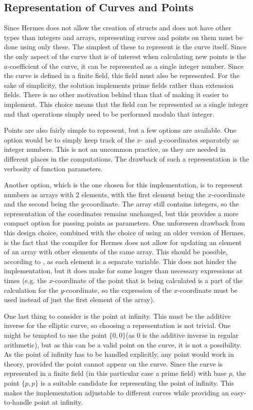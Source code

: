 \subsection{Representation of Curves and Points}
Since Hermes does not allow the creation of structs and does not have other types than integers and arrays, representing curves and points on them must be done using only these. The simplest of these to represent is the curve itself. Since the only aspect of the curve that is of interest when calculating new points is the $a$-coefficient of the curve, it can be represented as a single integer number. Since the curve is defined in a finite field, this field must also be represented. For the sake of simplicity, the solution implements prime fields rather than extension fields. There is no other motivation behind than that of making it easier to implement. This choice means that the field can be represented as a single integer and that operations simply need to be performed modulo that integer.

Points are also fairly simple to represent, but a few options are available. One option would be to simply keep track of the $x$- and $y$-coordinates separately as integer numbers. This is not an uncommon practice, as they are needed in different places in the computations. The drawback of such a representation is the verbosity of function parameters.

Another option, which is the one chosen for this implementation, is to represent numbers as arrays with 2 elements, with the first element being the $x$-coordinate and the second being the $y$-coordinate. The array still contains integers, so the representation of the coordinates remains unchanged, but this provides a more compact option for passing points as parameters. One unforeseen drawback from this design choice, combined with the choice of using an older version of Hermes, is the fact that the compiler for Hermes does not allow for updating an element of an array with other elements of the same array. This should be possible, according to \cite{PSI19}, as each element is a separate variable. This does not hinder the implementation, but it does make for some longer than necessary expressions at times (e.g. the $x$-coordinate of the point that is being calculated is a part of the calculation for the $y$-coordinate, so the expression of the $x$-coordinate must be used instead of just the first element of the array).

One last thing to consider is the point at infinity. This must be the additive inverse for the elliptic curve, so choosing a representation is not trivial. One might be tempted to use the point $\{0,0\}$(as $0$ is the additive inverse in regular arithmetic), but as this can be a valid point on the curve, it is not a possibility. As the point of infinity has to be handled explicitly, any point would work in theory, provided the point cannot appear on the curve. Since the curve is represented in a finite field (in this particular case a prime field) with base $p$, the point $\{p,p\}$ is a suitable candidate for representing the point of infinity. This makes the implementation adjustable to different curves while providing an easy-to-handle point at infinity.


